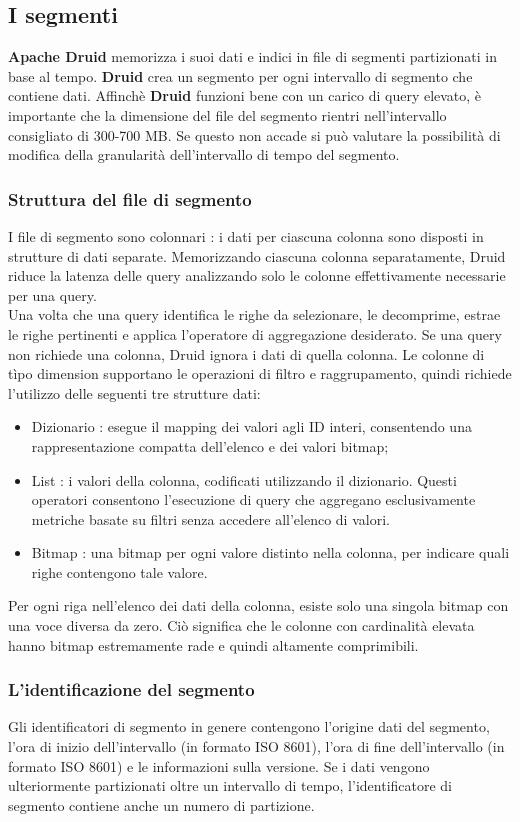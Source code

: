 \documentclass{article}
\begin{document}
\subsection{I segmenti}
\textbf{Apache Druid} memorizza i suoi dati e indici in file di segmenti partizionati in base al tempo.
\textbf{Druid} crea un segmento per ogni intervallo di segmento che contiene dati.
Affinchè \textbf{Druid} funzioni bene  con un carico di query elevato, è importante che la dimensione del file del segmento rientri nell'intervallo consigliato di 300-700 MB. Se questo non accade si può valutare la possibilità di modifica della granularità dell'intervallo di tempo del segmento.
\subsubsection{Struttura del file di segmento}
I file di segmento sono colonnari : i dati per ciascuna colonna sono disposti in strutture di dati separate. Memorizzando ciascuna colonna separatamente, Druid riduce la latenza delle query analizzando solo le colonne effettivamente necessarie per una query. \\
Una volta che una query identifica le righe da selezionare, le decomprime, estrae le righe pertinenti e applica l'operatore di aggregazione desiderato.  Se una query non richiede una colonna, Druid ignora i dati di quella colonna.
Le colonne di tìpo dimension supportano le operazioni di filtro e raggrupamento, quindi richiede l'utilizzo delle seguenti tre strutture dati: 
\begin{itemize}
    \item Dizionario : esegue il mapping dei valori agli ID interi, consentendo una rappresentazione compatta dell'elenco e dei valori bitmap;
    \item List : i valori della colonna, codificati utilizzando il dizionario.
    Questi operatori consentono l'esecuzione di query che aggregano esclusivamente metriche basate su filtri senza accedere all'elenco di valori.
    \item Bitmap : una bitmap per ogni valore distinto nella colonna, per indicare quali righe contengono tale valore.
\end{itemize}
Per ogni riga nell'elenco dei dati della colonna, esiste solo una singola bitmap con una voce diversa da zero. Ciò significa che le colonne con cardinalità elevata hanno bitmap estremamente rade e quindi altamente comprimibili. 
\subsubsection{L'identificazione del segmento}
Gli identificatori di segmento in genere contengono l'origine dati del segmento, l'ora di inizio dell'intervallo (in formato ISO 8601), l'ora di fine dell'intervallo (in formato ISO 8601) e le informazioni sulla versione. Se i dati vengono ulteriormente partizionati oltre un intervallo di tempo, l'identificatore di segmento contiene anche un numero di partizione.
\end{document}
